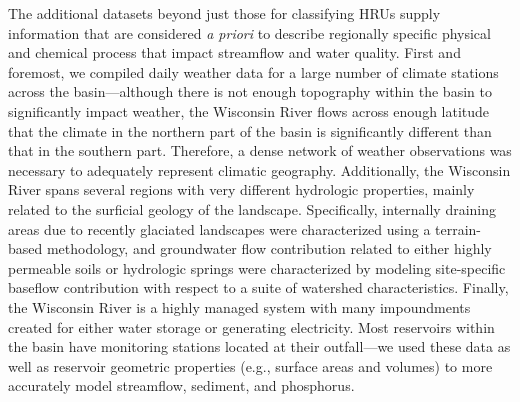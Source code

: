 The additional datasets beyond just those for classifying HRUs supply
information that are considered \textit{a priori} to describe regionally
specific physical and chemical process that impact streamflow and water quality.
First and foremost, we compiled daily weather data for a large number of climate
stations across the basin---although there is not enough topography within the
basin to significantly impact weather, the Wisconsin River flows across enough
latitude that the climate in the northern part of the basin is significantly
different than that in the southern part. Therefore, a dense network of weather
observations was necessary to adequately represent climatic geography.
Additionally, the Wisconsin River spans several regions with very different
hydrologic properties, mainly related to the surficial geology of the landscape.
Specifically, internally draining areas due to recently glaciated landscapes
were characterized using a terrain-based methodology, and groundwater flow
contribution related to either highly permeable soils or hydrologic springs were
characterized by modeling site-specific baseflow contribution with respect to a
suite of watershed characteristics. Finally, the Wisconsin River is a highly
managed system with many impoundments created for either water storage or
generating electricity. Most reservoirs within the basin have monitoring
stations located at their outfall---we used these data as well as reservoir
geometric properties (e.g., surface areas and volumes) to more accurately model
streamflow, sediment, and phosphorus.


